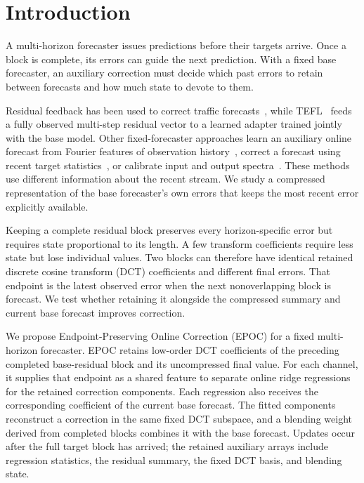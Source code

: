 \section{Introduction}
\label{sec:introduction}

A multi-horizon forecaster issues predictions before their targets arrive. Once a block is complete, its errors can guide the next prediction. With a fixed base forecaster, an auxiliary correction must decide which past errors to retain between forecasts and how much state to devote to them.

Residual feedback has been used to correct traffic forecasts~\cite{rescal2022}, while TEFL~\cite{tefl2026} feeds a fully observed multi-step residual vector to a learned adapter trained jointly with the base model. Other fixed-forecaster approaches learn an auxiliary online forecast from Fourier features of observation history~\cite{elf2025}, correct a forecast using recent target statistics~\cite{cosa2026}, or calibrate input and output spectra~\cite{fac2026}. These methods use different information about the recent stream. We study a compressed representation of the base forecaster's own errors that keeps the most recent error explicitly available.

Keeping a complete residual block preserves every horizon-specific error but requires state proportional to its length. A few transform coefficients require less state but lose individual values. Two blocks can therefore have identical retained discrete cosine transform (DCT) coefficients and different final errors. That endpoint is the latest observed error when the next nonoverlapping block is forecast. We test whether retaining it alongside the compressed summary and current base forecast improves correction.

We propose Endpoint-Preserving Online Correction (EPOC) for a fixed multi-horizon forecaster. EPOC retains low-order DCT coefficients of the preceding completed base-residual block and its uncompressed final value. For each channel, it supplies that endpoint as a shared feature to separate online ridge regressions for the retained correction components. Each regression also receives the corresponding coefficient of the current base forecast. The fitted components reconstruct a correction in the same fixed DCT subspace, and a blending weight derived from completed blocks combines it with the base forecast. Updates occur after the full target block has arrived; the retained auxiliary arrays include regression statistics, the residual summary, the fixed DCT basis, and blending state.

